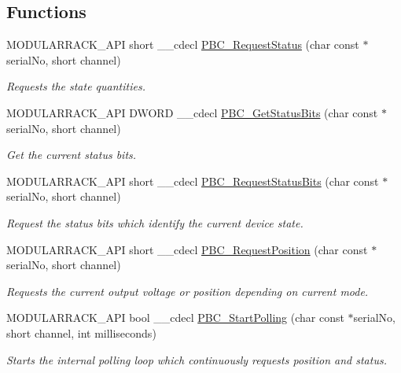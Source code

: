\subsection*{Functions}
\begin{DoxyCompactItemize}
\item 
M\+O\+D\+U\+L\+A\+R\+R\+A\+C\+K\+\_\+\+A\+PI short \+\_\+\+\_\+cdecl \hyperlink{group___modular_piezo_gab3757f37b062fe8a74044df73397d40a}{P\+B\+C\+\_\+\+Request\+Status} (char const $\ast$serial\+No, short channel)
\begin{DoxyCompactList}\small\item\em Requests the state quantities. \end{DoxyCompactList}\item 
M\+O\+D\+U\+L\+A\+R\+R\+A\+C\+K\+\_\+\+A\+PI D\+W\+O\+RD \+\_\+\+\_\+cdecl \hyperlink{group___modular_piezo_ga3da594941a3c06d7b7795a289eb09a71}{P\+B\+C\+\_\+\+Get\+Status\+Bits} (char const $\ast$serial\+No, short channel)
\begin{DoxyCompactList}\small\item\em Get the current status bits. \end{DoxyCompactList}\item 
M\+O\+D\+U\+L\+A\+R\+R\+A\+C\+K\+\_\+\+A\+PI short \+\_\+\+\_\+cdecl \hyperlink{group___modular_piezo_ga30716e7d5e31873e52f11ded71edc22e}{P\+B\+C\+\_\+\+Request\+Status\+Bits} (char const $\ast$serial\+No, short channel)
\begin{DoxyCompactList}\small\item\em Request the status bits which identify the current device state. \end{DoxyCompactList}\item 
M\+O\+D\+U\+L\+A\+R\+R\+A\+C\+K\+\_\+\+A\+PI short \+\_\+\+\_\+cdecl \hyperlink{group___modular_piezo_gae2a2b4966d3b07999f06ecd437388cdb}{P\+B\+C\+\_\+\+Request\+Position} (char const $\ast$serial\+No, short channel)
\begin{DoxyCompactList}\small\item\em Requests the current output voltage or position depending on current mode. \end{DoxyCompactList}\item 
M\+O\+D\+U\+L\+A\+R\+R\+A\+C\+K\+\_\+\+A\+PI bool \+\_\+\+\_\+cdecl \hyperlink{group___modular_piezo_ga334d4f057f38fa5e9a5a37a823b6e3d6}{P\+B\+C\+\_\+\+Start\+Polling} (char const $\ast$serial\+No, short channel, int milliseconds)
\begin{DoxyCompactList}\small\item\em Starts the internal polling loop which continuously requests position and status. \end{DoxyCompactList}\item 

\end{DoxyCompactItemize}
